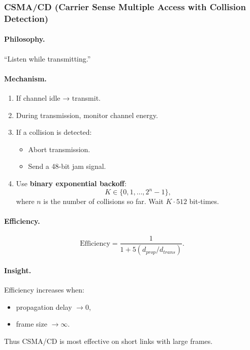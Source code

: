 \documentclass[12pt]{article}
\begin{document}
\subsubsection{CSMA/CD (Carrier Sense Multiple Access with Collision Detection)}

\paragraph{Philosophy.}
``Listen while transmitting.''

\paragraph{Mechanism.}
\begin{enumerate}
    \item If channel idle → transmit.
    \item During transmission, monitor channel energy.
    \item If a collision is detected:
          \begin{itemize}
              \item Abort transmission.
              \item Send a 48-bit jam signal.
          \end{itemize}
    \item Use \textbf{binary exponential backoff}:
          \[
              K \in \{0,1,\dots,2^n - 1\},
          \]
          where $n$ is the number of collisions so far. Wait $K \cdot 512$ bit-times.
\end{enumerate}

\paragraph{Efficiency.}
\[
    \text{Efficiency} = \frac{1}{1 + 5(d_{prop}/d_{trans})}.
\]

\paragraph{Insight.}
Efficiency increases when:
\begin{itemize}
    \item propagation delay $\to 0$,
    \item frame size $\to \infty$.
\end{itemize}

Thus CSMA/CD is most effective on short links with large frames.

\end{document}
